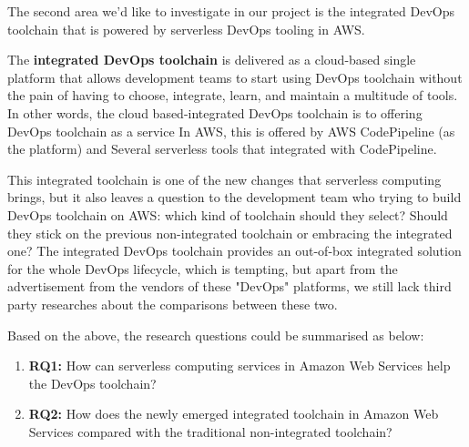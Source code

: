 \par
The second area we'd like to investigate in our project is the integrated DevOps toolchain that is powered by serverless DevOps tooling in AWS. 
\par
The \textbf{integrated DevOps toolchain} is delivered as a cloud-based single platform that allows development teams to start using DevOps toolchain without the pain of having to choose, integrate, learn, and maintain a multitude of tools. In other words, the cloud based-integrated DevOps toolchain is to offering DevOps toolchain as a service
In AWS, this is offered by AWS CodePipeline (as the platform) and Several serverless tools that integrated with CodePipeline.
\par
This integrated toolchain is one of the new changes that serverless computing brings, but it also leaves a question to the development team who trying to build DevOps toolchain on AWS: which kind of toolchain should they select? Should they stick on the previous non-integrated toolchain or embracing the integrated one? The integrated DevOps toolchain provides an out-of-box integrated solution for the whole DevOps lifecycle, which is tempting, but apart from the advertisement from the vendors of these "DevOps" platforms, we still lack third party researches about the comparisons between these two. 
\par
Based on the above, the research questions could be summarised as below:
\begin{enumerate}
    \item \textbf{RQ1:} How can serverless computing services in Amazon Web Services help the DevOps toolchain?
    \item \textbf{RQ2:} How does the newly emerged integrated toolchain in Amazon Web Services compared with the traditional non-integrated toolchain?
\end{enumerate}
